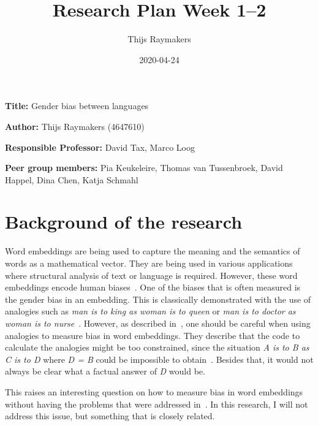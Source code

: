 \documentclass[english, a4paper, 10pt]{article}
\title{Research Plan Week 1--2}
\author{Thijs Raymakers}
\date{2020-04-24}
\newcommand{\namelistlabel}[1]{\mbox{#1}\hfil}
\newenvironment{namelist}[1]{%
\begin{list}{}
    {
        \let\makelabel\namelistlabel
        \settowidth{\labelwidth}{#1}
        \setlength{\leftmargin}{1.1\labelwidth}
    }
  }{%
\end{list}}
\begin{document}
\maketitle

\begin{namelist}{xxxxxxxxxxxxxxxxxxxxxxxxxxxxxxxxxxxxxxx}
\item[{\bf Title:}]
    Gender bias between languages
\item[{\bf Author:}]
    Thijs Raymakers (4647610)
\item[{\bf Responsible Professor:}]
    David Tax, Marco Loog
\item[{\bf Peer group members:}]
    Pia Keukeleire, 
    Thomas van Tussenbroek,
    David Happel,
    Dina Chen,
    Katja Schmahl
\end{namelist}


\section*{Background of the research}
Word embeddings are being used to capture the meaning and the semantics of words as a
mathematical vector. They are being used in various applications where structural
analysis of text or language is required. However, these word embeddings encode
human biases~\cite{caliskan_2017_semantics_language_corpora, 2019arXiv190509866N, 2017arXiv171108412G, 2018arXiv180309288K, 2019arXiv190303862G}. One of the biases that is often
measured is the gender bias in an embedding. This is classically demonstrated with the
use of analogies such as \textit{man is to king as woman is to queen} or \textit{man is to doctor as woman is to nurse}~\cite{2019arXiv190509866N}.
However, as described in~\cite{2019arXiv190509866N}, one should be careful when using
analogies to measure bias in word embeddings. They describe that the code to calculate
the analogies might be too constrained, since the situation \textit{A is to B as C is to D}
where \textit{D = B} could be impossible to obtain~\cite{2019arXiv190509866N}. Besides
that, it would not always be clear what a factual answer of \textit{D} would be.

This raises an interesting question on how to measure bias in word embeddings without
having the problems that were addressed in~\cite{2019arXiv190509866N}.
In this research, I will not address this issue, but something that is closely related.
\end{document}
